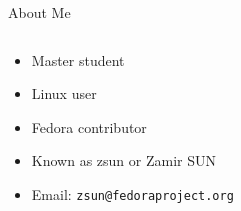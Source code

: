 \begin{frame}{About Me}
  \begin{columns}
    \begin{column}{.75\textwidth}
  \begin{itemize}
    \item Master student
    \item Linux user
    \item Fedora contributor
    \item Known as zsun or Zamir SUN
    \item Email: \texttt{zsun@fedoraproject.org}
  \end{itemize}
    \end{column}
    \begin{column}{.25\textwidth}
      \begin{figure}[htbp]
        \centering
      \end{figure}
    \end{column}
  \end{columns}
\end{frame}
